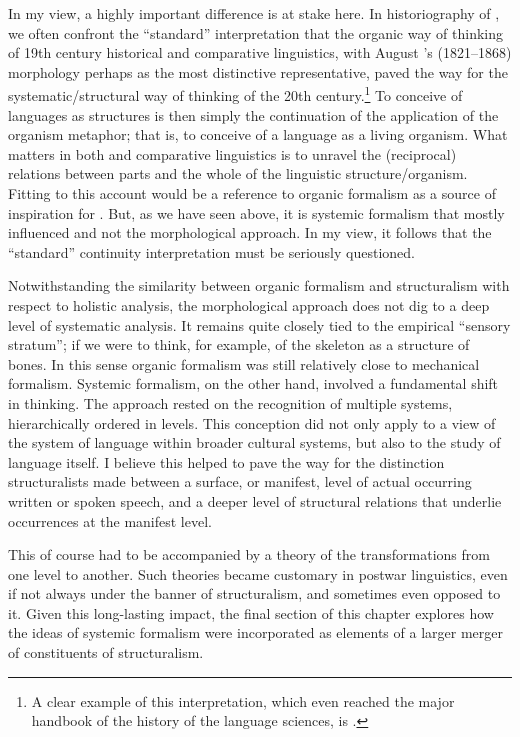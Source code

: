 \documentclass[output=paper]{langscibook}
\begin{document}
In my view, a highly important difference is at stake here. In historiography of , we often confront the ``standard'' interpretation that the organic way of thinking of 19th century historical and comparative linguistics, with August {\Schleicher}'s (1821--1868) morphology perhaps as the most distinctive representative, paved the way for the systematic/structural way of thinking of the 20th century.\footnote{A clear example of this interpretation, which even reached the major handbook of the history of the language sciences, is \citet{Kohrt2001}.} To conceive of languages as structures is then simply the continuation of the application of the organism metaphor; that is, to conceive of a language as a living organism. What matters in both  and comparative linguistics is to unravel the (reciprocal) relations between parts and the whole of the linguistic structure/organism. Fitting to this account would be a reference to organic formalism as a source of inspiration for . But, as we have seen above, it is systemic formalism that mostly influenced  and not the morphological approach. In my view, it follows that the ``standard'' continuity interpretation must be seriously questioned. 

Notwithstanding the similarity between organic formalism and structuralism with respect to holistic analysis, the morphological approach does not dig to a deep level of systematic analysis. It remains quite closely tied to the empirical ``sensory stratum''; if we were to think, for example, of the skeleton as a structure of bones. In this sense organic formalism was still relatively close to mechanical formalism. Systemic formalism, on the other hand, involved a fundamental shift in thinking. The approach rested on the recognition of multiple systems, hierarchically ordered in levels. This conception did not only apply to a view of the system of language within broader cultural systems, but also to the study of language itself. I believe this helped to pave the way for the distinction structuralists made between a surface, or manifest, level of actual occurring written or spoken speech, and a deeper level of structural relations that underlie occurrences at the manifest level.

This of course had to be accompanied by a theory of the transformations from one level to another. Such theories became customary in postwar linguistics, even if not always under the banner of structuralism, and sometimes even opposed to it. Given this long-lasting impact, the final section of this chapter explores how the ideas of systemic formalism were incorporated as elements of a larger merger of constituents of structuralism.
\end{document}
